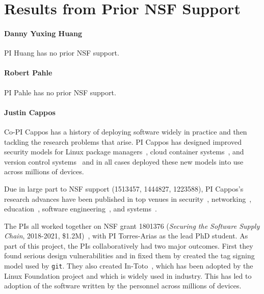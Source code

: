 \section{Results from Prior NSF Support}

\paragraph{Danny Yuxing Huang}
PI Huang has no prior NSF support.

\paragraph{Robert Pahle}
PI Pahle has no prior NSF support.



\paragraph{Justin Cappos}
Co-PI Cappos has a history of deploying software widely in practice and then
tackling the research problems that arise. PI Cappos has designed improved
security models for Linux package managers~\cite{Cappos_CCS_2008}, cloud
container systems~\cite{Kuppusamy_NSDI_2016, Kuppusamy_USENIX_2017}, and
version control systems~\cite{Torres_USENIXSec_2016} and in all cases
deployed these new models into use across millions of devices.

Due in large part to NSF support (1513457, 1444827, 1223588), PI Cappos's
research advances have been published in top venues in
security~\cite{Cappos_CCS_2010, Samuel_CCS_2010, Torres_USENIXSec_2016, Nikitin_USENIXSec_2017, in-toto-paper},
networking~\cite{Zhuang_NSDI_2014, Kuppusamy_NSDI_2016},
education~\cite{Cappos_SIGCSE_2009, Cappos_SIGCSE_2014, Hooshangi_SIGCSE_2015},
software engineering~\cite{Rasley_ISSRE_2015, Oliveira_ACSAC_2014,
Gopstein_FSE_2017},
and systems~\cite{Li_USENIX_2015, Li_USENIX_2017, Kuppusamy_USENIX_2017}.

The PIs all worked together on NSF grant 1801376 (\emph{Securing the Software Supply Chain},
2018-2021, \$1.2M)~\cite{Torres_USENIXSec_2016, le-git-imate, ifip-sec-19, in-toto-paper , le-git-imate-journal}, with PI Torres-Arias as the lead PhD student.
As part of this project, the PIs collaboratively had two major outcomes.  First they found serious design
vulnerabilities and in fixed them by created the tag signing model used by
{\tt git}.  They also created In-Toto~\cite{in-toto-website}, which has been adopted by the Linux
Foundation project and which is widely used in industry.
This has led to adoption of the software
written by the personnel across millions of devices.

